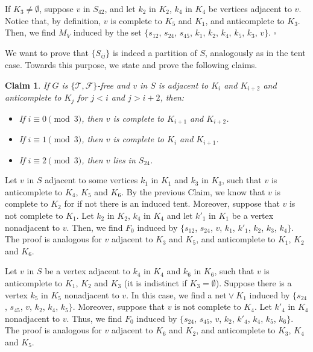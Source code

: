 \documentclass[12pt]{book}
\theoremstyle{plain}
\newtheorem{claim}[teo]{Claim}
\theoremstyle{remark}
\newcommand*{\QED}{\hfill\ensuremath{\square}}%
\begin{document}
If $K_3 \neq \emptyset$, suppose $v$ in $S_{42}$, and let $k_2$ in $K_2$, $k_4$ in $K_4$ be vertices adjacent to $v$. Notice that, by definition, $v$ is complete to $K_5$ and $K_1$, and anticomplete to $K_3$. Then, we find $M_V$ induced by the set $\{ s_{12}$, $s_{24}$, $s_{45}$, $k_1$, $k_2$, $k_4$, $k_5$, $k_3$, $v \}$. \QED

We want to prove that $\{S_{ij}\}$ is indeed a partition of $S$, analogously as in the tent case. Towards this purpose, we state and prove the following claims.

\begin{claim} \label{claim:4tent_2}
	If $G$ is $\{ \mathcal{T}, \mathcal{F} \}$-free and $v$ in $S$ is adjacent to $K_i$ and $K_{i+2}$ and anticomplete to $K_j$ for $j < i$ and $j>i+2$, then:
	\begin{itemize}
		\item If $i \equiv 0 \pmod{3}$, then $v$ is complete to $K_{i+1}$ and $K_{i+2}$.
		\item If $i \equiv 1 \pmod 3$, then $v$ is complete to $K_i$ and $K_{i+1}$.
		\item If $i \equiv 2 \pmod{3}$, then $v$ lies in $S_{24}$.
	\end{itemize}
\end{claim}

Let $v$ in $S$ adjacent to some vertices $k_1$ in $K_1$ and $k_3$ in $K_3$, such that $v$ is anticomplete to $K_4$, $K_5$ and $K_6$. By the previous Claim, we know that $v$ is complete to $K_2$ for if not there is an induced tent.
Moreover, suppose that $v$ is not complete to $K_1$. Let $k_2$ in $K_2$, $k_4$ in $K_4$ and let $k'_1$ in $K_1$ be a vertex nonadjacent to $v$. Then, we find $F_0$ induced by $\{ s_{12}$, $s_{24}$, $v$, $k_1$, $k'_1$, $k_2$, $k_3$, $k_4 \}$.
The proof is analogous for $v$ adjacent to $K_3$ and $K_5$, and anticomplete to $K_1$, $K_2$ and $K_6$.

\vspace{1mm}
Let $v$ in $S$ be a vertex adjacent to $k_4$ in $K_4$ and $k_6$ in $K_6$, such that $v$ is anticomplete to $K_1$, $K_2$ and $K_3$ (it is indistinct if $K_3 = \emptyset$). Suppose there is a vertex $k_5$ in $K_5$ nonadjacent to $v$. In this case, we find a net${}\vee{}K_1$ induced by $\{s_{24}$, $s_{45}$, $v$, $k_2$, $k_4$, $k_5 \}$.
Moreover, suppose that $v$ is not complete to $K_4$. Let $k'_4$ in $K_4$ nonadjacent to $v$. Thus, we find $F_0$ induced by $\{ s_{24}$, $s_{45}$, $v$, $k_2$, $k'_4$, $k_4$, $k_5$, $k_6 \}$.
The proof is analogous for $v$ adjacent to $K_6$ and $K_2$, and anticomplete to $K_3$, $K_4$ and $K_5$.
\end{document}
